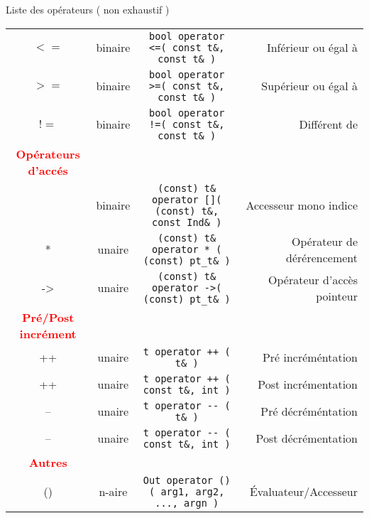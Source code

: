 \documentclass[handout,10pt]{beamer}
\begin{document}
\begin{frame}[fragile]{Liste des opérateurs ( non exhaustif )}
\begin{tabular}{cccr}
    $<=$ & binaire & \lstinline$bool operator <=( const t&, const t& )$ & Inférieur ou égal à \\
    $>=$ & binaire & \lstinline$bool operator >=( const t&, const t& )$ & Supérieur ou égal à \\
    $!=$ & binaire & \lstinline$bool operator !=( const t&, const t& )$ & Différent de \\
{\textcolor{red}{\bf Opérateurs d'accés}} & & &\\ \hline
    [] & binaire & \lstinline$(const) t& operator []( (const) t&, const Ind& )$ & Accesseur mono indice \\
    *  & unaire  & \lstinline$(const) t& operator * ( (const) pt_t& )$ & Opérateur de dérérencement     \\
    -> & unaire  & \lstinline$(const) t& operator ->( (const) pt_t& )$ & Opérateur d'accès pointeur     \\
{\textcolor{red}{\bf Pré/Post incrément}} & & &\\ \hline
    ++ & unaire  & \lstinline$t operator ++ ( t& )$ & Pré incréméntation \\
    ++ & unaire  & \lstinline$t operator ++ ( const t&, int )$ & Post incrémentation \\
    -- & unaire  & \lstinline$t operator -- ( t& )$ & Pré décréméntation \\
    -- & unaire  & \lstinline$t operator -- ( const t&, int )$ & Post décrémentation \\   
{\textcolor{red}{\bf Autres}} & & &\\ \hline
    () & n-aire & \lstinline$Out operator () ( arg1, arg2, ..., argn )$ & \'Evaluateur/Accesseur \\
\end{tabular}
\end{frame}
\end{document}
